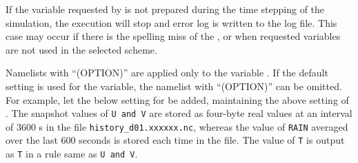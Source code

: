 
If the variable requested by  is not prepared during the time stepping of the simulation, the execution will stop and error log is written to the log file.
This case may occur if there is the spelling miss of the , or when requested variables are not used in the selected scheme.

Namelists with ``(OPTION)'' are applied only to the variable . 
If the default setting is used for the variable, the namelist with ``(OPTION)'' can be omitted. 
For example, let the below setting for  be added, maintaining the above setting of . 
The snapshot values of \verb|U and V| are stored as four-byte real values at an interval of 3600 s in the file \verb|history_d01.xxxxxx.nc|, whereas the value of \verb|RAIN| averaged over the last 600 seconds is stored each time in the file. 
The value of \verb|T| is output as \verb|T| in a rule same as \verb|U and V|. 




